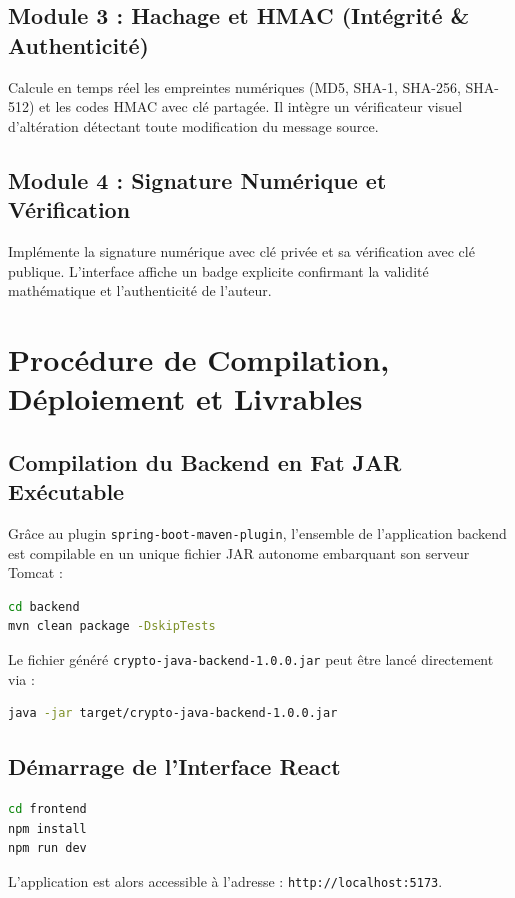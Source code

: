 \documentclass[12pt,a4paper]{report}
\begin{document}
\section{Module 3 : Hachage et HMAC (Intégrité \& Authenticité)}
Calcule en temps réel les empreintes numériques (MD5, SHA-1, SHA-256, SHA-512) et les codes HMAC avec clé partagée. Il intègre un vérificateur visuel d'altération détectant toute modification du message source.

\section{Module 4 : Signature Numérique et Vérification}
Implémente la signature numérique avec clé privée et sa vérification avec clé publique. L'interface affiche un badge explicite confirmant la validité mathématique et l'authenticité de l'auteur.

\newpage

\chapter{Procédure de Compilation, Déploiement et Livrables}

\section{Compilation du Backend en Fat JAR Exécutable}
Grâce au plugin \texttt{spring-boot-maven-plugin}, l'ensemble de l'application backend est compilable en un unique fichier JAR autonome embarquant son serveur Tomcat :
\begin{lstlisting}[language=bash, caption=Commande de génération du JAR exécutable]
cd backend
mvn clean package -DskipTests
\end{lstlisting}
Le fichier généré \texttt{crypto-java-backend-1.0.0.jar} peut être lancé directement via :
\begin{lstlisting}[language=bash, caption=Lancement de l'application JAR]
java -jar target/crypto-java-backend-1.0.0.jar
\end{lstlisting}

\section{Démarrage de l'Interface React}
\begin{lstlisting}[language=bash, caption=Commandes de démarrage du Frontend React]
cd frontend
npm install
npm run dev
\end{lstlisting}
L'application est alors accessible à l'adresse : \texttt{http://localhost:5173}.
\end{document}
